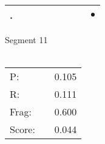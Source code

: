 \documentclass[landscape]{article}
\newcommand{\ssp}{\hspace{2pt}}
\newcommand{\mex}{\cellcolor{g}$\bullet$}
\begin{document}
\begin{tabular}{|l|p{10pt}|p{10pt}|p{10pt}|p{10pt}|p{10pt}|p{10pt}|p{10pt}|p{10pt}|}
\hline
\ssp \cellcolor{ref7}. \ssp&\hspace{2pt}&\hspace{2pt}&\hspace{2pt}&\hspace{2pt}&\hspace{2pt}&\hspace{2pt}&\hspace{2pt}&\hspace{2pt}\mex\\
\hline
\end{tabular}

\vspace{6pt}
\noindent Segment 11\\\\
\noindent\begin{tabular}{lm{12pt}r}
\hline
P:&&0.105\\
R:&&0.111\\
Frag:&&0.600\\
Score:&&0.044\\
\end{tabular}

\newpage
\end{document}
